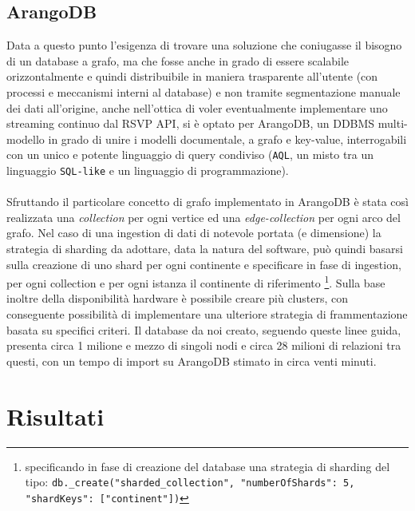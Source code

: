 \documentclass[fleqn,10pt]{SelfArx} %
\begin{document}
{\subsection{ArangoDB}
Data a questo punto l'esigenza di trovare una soluzione che coniugasse il bisogno di un database a grafo, ma che fosse anche in grado di essere scalabile orizzontalmente e quindi distribuibile in maniera trasparente all'utente (con processi e meccanismi interni al database) e non tramite segmentazione manuale dei dati all'origine, anche nell'ottica di voler eventualmente implementare uno streaming continuo dal RSVP API, si è optato per ArangoDB, un DDBMS multi-modello in grado di unire i modelli documentale, a grafo e key-value, interrogabili con un unico e potente linguaggio di query condiviso (\texttt{AQL}, un misto tra un linguaggio \texttt{SQL-like} e un linguaggio di programmazione).\\
\\
Sfruttando il particolare concetto di grafo implementato in ArangoDB è stata così realizzata una \textit{collection} per ogni vertice ed una \textit{edge-collection} per ogni arco del grafo. 
Nel caso di una ingestion di dati di notevole portata (e dimensione) la strategia di sharding da adottare, data la natura del software, può quindi basarsi sulla creazione di uno shard per ogni continente e specificare in fase di ingestion, per ogni collection e per ogni istanza il continente di riferimento \footnote{specificando in fase di creazione del database una strategia di sharding del tipo: \texttt{db.\_create("sharded\_collection", {"numberOfShards": 5, "shardKeys": ["continent"]})}}. 
Sulla base inoltre della disponibilità hardware è possibile creare più clusters, con conseguente possibilità di implementare una ulteriore strategia di frammentazione basata su specifici criteri.
Il database da noi creato, seguendo queste linee guida, presenta circa 1 milione e mezzo di singoli nodi e circa 28 milioni di relazioni tra questi, con un tempo di import su ArangoDB stimato in circa venti minuti.
\newpage
\section{Risultati}
}
\end{document}
